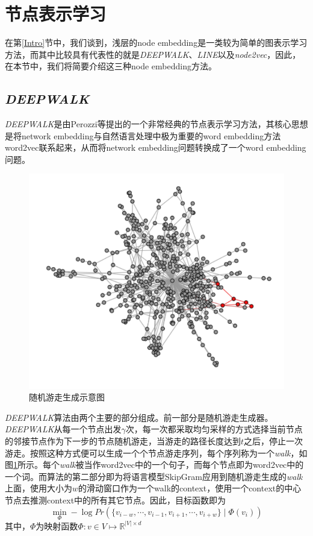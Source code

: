 \section{节点表示学习}
在第\ref{Intro}节中，我们谈到，浅层的node embedding是一类较为简单的图表示学习方法，而其中比较具有代表性的就是\emph{DEEPWALK}、\emph{LINE}以及\emph{node2vec}，因此，在本节中，我们将简要介绍这三种node embedding方法。

\subsection{\emph{DEEPWALK}}
\emph{DEEPWALK}是由Perozzi等\cite{perozzi2014deepwalk}提出的一个非常经典的节点表示学习方法，其核心思想是将network embedding与自然语言处理中极为重要的word embedding方法word2vec联系起来，从而将network embedding问题转换成了一个word embedding问题。

\begin{figure}[!htbp]
  \centering
  \includegraphics[scale=1]{Fig/randomwalk.pdf}
  \caption{随机游走生成示意图\cite{perozzi2014deepwalk}}
  \label{fig:randomwalk}
\end{figure}

\emph{DEEPWALK}算法由两个主要的部分组成。前一部分是随机游走生成器。\emph{DEEPWALK}从每一个节点出发$\gamma$次，每一次都采取均匀采样的方式选择当前节点的邻接节点作为下一步的节点随机游走，当游走的路径长度达到$t$之后，停止一次游走。按照这种方式便可以生成一个个节点游走序列，每个序列称为一个\emph{walk}，如图\ref{fig:randomwalk}所示。每个\emph{walk}被当作word2vec中的一个句子，而每个节点即为word2vec中的一个词。而算法的第二部分即为将语言模型SkipGram应用到随机游走生成的\emph{walk}上面，使用大小为$w$的滑动窗口作为一个walk的context，使用一个context的中心节点去推测context中的所有其它节点。因此，目标函数即为
\[\min_{\Phi}-\log{Pr}(\{v_{i-w}, \cdots, v_{i-1}, v_{i+1}, \cdots, v_{i+w}\}\mid \Phi(v_i))\]
其中，$\Phi$为映射函数$\Phi: v\in V\mapsto \mathbb{R}^{|V|\times d}$

